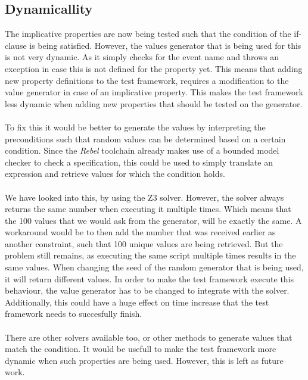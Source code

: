 \subsection*{Dynamicallity}
The implicative properties are now being tested such that the condition of the if-clause is being satisfied. However, the values generator that is being used for this is not very dynamic. As it simply checks for the event name and throws an exception in case this is not defined for the property yet. This means that adding new property definitions to the test framework, requires a modification to the value generator in case of an implicative property. This makes the test framework less dynamic when adding new properties that should be tested on the generator.\\
\\
To fix this it would be better to generate the values by interpreting the preconditions such that random values can be determined based on a certain condition. Since the \textit{Rebel} toolchain already makes use of a bounded model checker to check a specification, this could be used to simply translate an expression and retrieve values for which the condition holds.\\
\\
We have looked into this, by using the Z3 solver. However, the solver always returns the same number when executing it multiple times. Which means that the 100 values that we would ask from the generator, will be exactly the same. A workaround would be to then add the number that was received earlier as another constraint, such that 100 unique values are being retrieved. But the problem still remains, as executing the same script multiple times results in the same values. When changing the seed of the random generator that is being used, it will return different values. In order to make the test framework execute this behaviour, the value generator has to be changed to integrate with the solver. Additionally, this could have a huge effect on time increase that the test framework needs to succesfully finish.\\
\\
There are other solvers available too, or other methods to generate values that match the condition. It would be usefull to make the test framework more dynamic when such properties are being used. However, this is left as future work.

